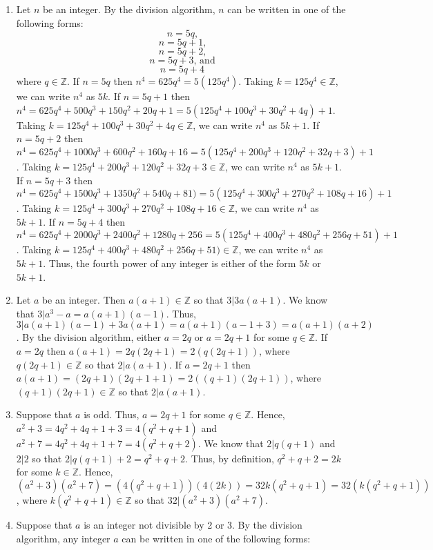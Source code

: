 \documentclass{article}
\newcommand{\integers}{\mathbb{Z}}
\begin{document}
\begin{enumerate}
	\item
		Let $n$ be an integer. By the division algorithm, $n$ can be written in one of the following forms:
		$$n = 5q\text{,}$$
		$$n = 5q + 1\text{,}$$
		$$n = 5q + 2\text{,}$$
		$$n = 5q + 3\text{, and}$$
		$$n = 5q + 4$$
		where $q \in \integers$. If $n = 5q$ then $n^4 = 625q^4 = 5(125q^4)$. Taking $k = 125q^4 \in \integers$, we can write $n^4$ as $5k$. If $n = 5q + 1$ then $n^4 = 625q^4 + 500q^3 + 150q^2 + 20q + 1 = 5(125q^4 + 100q^3 + 30q^2 + 4q) + 1$. Taking $k = 125q^4 + 100q^3 + 30q^2 + 4q \in \integers$, we can write $n^4$ as $5k + 1$. If $n = 5q + 2$ then $n^4 = 625q^4 + 1000q^3 + 600q^2 + 160q + 16 = 5(125q^4 + 200q^3 + 120q^2 + 32q + 3) + 1$. Taking $k = 125q^4 + 200q^3 + 120q^2 + 32q + 3 \in \integers$, we can write $n^4$ as $5k + 1$. If $n = 5q + 3$ then $n^4 = 625q^4 + 1500q^3 + 1350q^2 + 540q + 81) = 5(125q^4 + 300q^3 + 270q^2 + 108q + 16) + 1$. Taking $k = 125q^4 + 300q^3 + 270q^2 + 108q + 16 \in \integers$, we can write $n^4$ as $5k + 1$. If $n = 5q + 4$ then $n^4 = 625q^4 + 2000q^3 + 2400q^2 + 1280q + 256 = 5(125q^4 + 400q^3 + 480q^2 + 256q + 51) + 1$. Taking $k = 125q^4 + 400q^3 + 480q^2 + 256q + 51) \in \integers$, we can write $n^4$ as $5k + 1$. Thus, the fourth power of any integer is either of the form $5k$ or $5k + 1$.
	\item
		Let $a$ be an integer. Then $a(a + 1) \in \integers$ so that $3 | 3a(a + 1)$. We know that $3 | a^3 - a = a(a + 1)(a - 1)$. Thus, $3 | a(a + 1)(a - 1) + 3a(a + 1) = a(a + 1)(a - 1 + 3) = a(a + 1)(a + 2)$. By the division algorithm, either $a = 2q$ or $a = 2q + 1$ for some $q \in \integers$. If $a = 2q$ then $a(a + 1) = 2q(2q + 1) = 2(q(2q + 1))$, where $q(2q + 1) \in \integers$ so that $2 | a(a + 1)$. If $a = 2q + 1$ then $a(a + 1) = (2q + 1)(2q + 1 + 1) = 2((q + 1)(2q + 1))$, where $(q + 1)(2q + 1) \in \integers$ so that $2 | a(a + 1)$.
	\item
		Suppose that $a$ is odd. Thus, $a = 2q + 1$ for some $q \in \integers$. Hence, $a^2 + 3 = 4q^2 + 4q + 1 + 3 = 4(q^2 + q + 1)$ and $a^2 + 7 = 4q^2 + 4q + 1 + 7 = 4(q^2 + q + 2)$. We know that $2 | q(q + 1)$ and $2 | 2$ so that $2 | q(q + 1) + 2 = q^2 + q + 2$. Thus, by definition, $q^2 + q + 2 = 2k$ for some $k \in \integers$. Hence, $(a^2 + 3)(a^2 + 7) = (4(q^2 + q + 1))(4(2k)) = 32k(q^2 + q + 1) = 32(k(q^2 + q + 1))$, where $k(q^2 + q + 1) \in \integers$ so that $32 | (a^2 + 3)(a^2 + 7)$.
	\item
		Suppose that $a$ is an integer not divisible by 2 or 3. By the division algorithm, any integer $a$ can be written in one of the following forms:

\end{enumerate}
\end{document}
